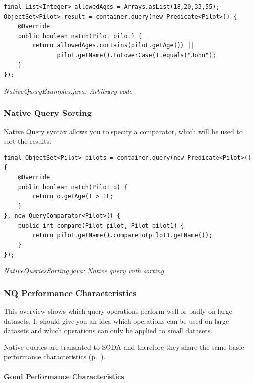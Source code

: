 \begin{lstlisting}
final List<Integer> allowedAges = Arrays.asList(18,20,33,55);
ObjectSet<Pilot> result = container.query(new Predicate<Pilot>() {
    @Override
    public boolean match(Pilot pilot) {
        return allowedAges.contains(pilot.getAge()) ||
               pilot.getName().toLowerCase().equals("John"); 
    }
});
\end{lstlisting}

{\small\itshape NativeQueryExamples.java: Arbitrary code\par}
\medskip

\subsubsection{Native Query Sorting}
\label{ref:basics-querying-native-queries-native-query-sorting}

Native Query syntax allows you to specify a comparator, which will be used to sort the results:

\begin{lstlisting}
final ObjectSet<Pilot> pilots = container.query(new Predicate<Pilot>() {
    @Override
    public boolean match(Pilot o) {
        return o.getAge() > 18;
    }
}, new QueryComparator<Pilot>() {
    public int compare(Pilot pilot, Pilot pilot1) {
        return pilot.getName().compareTo(pilot1.getName());
    }
});
\end{lstlisting}

{\small\itshape NativeQueriesSorting.java: Native query with sorting\par}
\medskip

\subsubsection{NQ Performance Characteristics}
\label{ref:basics-querying-native-queries-nq-performance-characteristics}

This overview shows which query operations perform well or badly on large datasets. It should give you an idea which operations can be used on large datasets and which operations can only be applied to small datasets.

Native queries are translated to SODA and therefore they share the same basic \hyperref[ref:basics-querying-soda-soda-performance-characteristics]{performance characteristics} (p.~\pageref{ref:basics-querying-soda-soda-performance-characteristics}).

\paragraph{Good Performance Characteristics}
\label{ref:basics-querying-native-queries-nq-performance-characteristics:goodperf}

